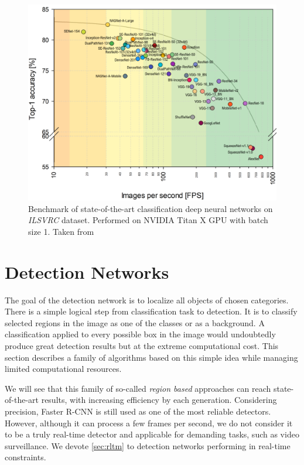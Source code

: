 \begin{figure}
    \includegraphics[width=\textwidth]{img/fps_comp}
    \caption[Benchmark of classification CNNs]%
    {Benchmark of state-of-the-art classification deep neural networks on \textit{ILSVRC} dataset. Performed on NVIDIA
Titan X GPU with batch size 1. Taken from \cite[fig. 3]{bib:cnnbenchmark}}
    \label{fig:cnnbenchmark}
\end{figure}



\section{Detection Networks}
\label{sec:detnets}
The goal of the detection network is to localize all objects of chosen categories. There is a simple logical step from classification task to detection. It is to classify selected regions in the image as one of the classes or as a background. A classification applied to every possible box in the image would undoubtedly produce great detection results but at the extreme computational cost. This section describes a family of algorithms based on this simple idea while managing limited computational resources.

We will see that this family of so-called \textit{region based} approaches can reach state-of-the-art results, with increasing efficiency by each generation. Considering precision, Faster R-CNN is still used as one of the most reliable detectors. However, although it can process a few frames per second, we do not consider it to be a truly real-time detector and applicable for demanding tasks, such as video surveillance. We devote \cref{sec:rltm} to detection networks performing in real-time constraints.

